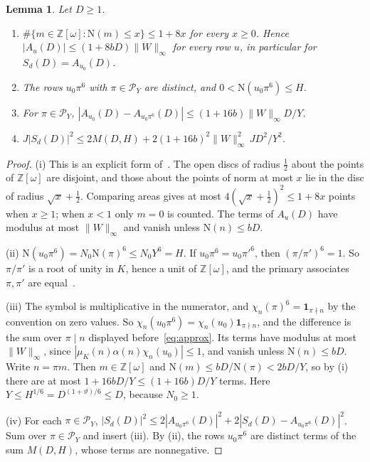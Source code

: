 \documentclass[11pt]{article}
\numberwithin{equation}{section}
\newcommand{\OO}{\mathbb Z[\omega]}
\newcommand{\N}{\mathrm N}
\newcommand{\muk}{\mu_K}
\newcommand{\ind}{\mathbf1}
\newtheorem{lemma}{Lemma}
\begin{document}
\begin{lemma}\label{lem:b1-extract}
Let $D\ge1$.
\begin{enumerate}
\item[(i)] $\#\{m\in\OO:\N(m)\le x\}\le1+8x$ for every $x\ge0$. Hence $|A_u(D)|\le(1+8bD)\|W\|_\infty$ for every
 row $u$, in particular for $S_d(D)=A_{u_0}(D)$.
\item[(ii)] The rows $u_0\pi^6$ with $\pi\in\mathcal P_Y$ are distinct, and $0<\N(u_0\pi^6)\le H$.
\item[(iii)] For $\pi\in\mathcal P_Y$, $|A_{u_0}(D)-A_{u_0\pi^6}(D)|\le(1+16b)\|W\|_\infty D/Y$.
\item[(iv)] $J|S_d(D)|^2\le2M(D,H)+2(1+16b)^2\|W\|_\infty^2\,JD^2/Y^2$.
\end{enumerate}
\end{lemma}

\begin{proof}
(i) This is an explicit form of~\cite[(2.4)]{QF}. The open discs of radius $\frac12$ about the points of $\OO$ are
disjoint, and those about the points of norm at most $x$ lie in the disc of radius $\sqrt x+\frac12$. Comparing areas
gives at most $4(\sqrt x+\frac12)^2\le1+8x$ points when $x\ge1$; when $x<1$ only $m=0$ is counted. The terms
of $A_u(D)$ have modulus at most $\|W\|_\infty$ and vanish unless $\N(n)\le bD$.

(ii) $\N(u_0\pi^6)=N_0\N(\pi)^6\le N_0Y^6=H$. If $u_0\pi^6=u_0\pi'^6$, then $(\pi/\pi')^6=1$. So $\pi/\pi'$ is a root of
unity in $K$, hence a unit of $\OO$, and the primary associates $\pi,\pi'$ are equal~\cite[Proposition~11]{QF}.

(iii) The symbol is multiplicative in the numerator, and $\chi_n(\pi)^6=\ind_{\pi\nmid n}$ by the convention on zero
values. So $\chi_n(u_0\pi^6)=\chi_n(u_0)\ind_{\pi\nmid n}$, and the difference is the sum over $\pi\mid n$ displayed
before~\eqref{eq:approx}. Its terms have modulus at most $\|W\|_\infty$, since $|\muk(n)\alpha(n)\chi_n(u_0)|\le1$, and
vanish unless $\N(n)\le bD$. Write $n=\pi m$. Then $m\in\OO$ and $\N(m)\le bD/\N(\pi)<2bD/Y$, so by (i) there are at
most $1+16bD/Y\le(1+16b)D/Y$ terms. Here $Y\le H^{1/6}=D^{(1+\vartheta)/6}\le D$, because $N_0\ge1$.

(iv) For each $\pi\in\mathcal P_Y$,
$|S_d(D)|^2\le2|A_{u_0\pi^6}(D)|^2+2|S_d(D)-A_{u_0\pi^6}(D)|^2$. Sum over $\pi\in\mathcal P_Y$ and insert (iii). By
(ii), the rows $u_0\pi^6$ are distinct terms of the sum $M(D,H)$, whose terms are nonnegative.
\end{proof}
\end{document}
